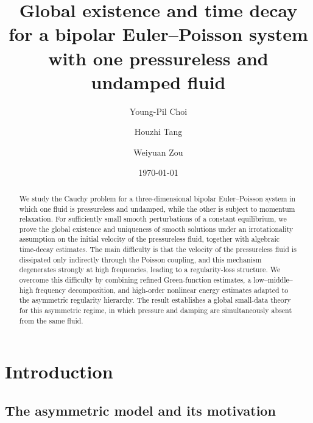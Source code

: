 \documentclass[10pt,reqno]{amsart}
\title[Global existence for an asymmetric bipolar Euler--Poisson system]
{Global existence and time decay for a bipolar Euler--Poisson system
with one pressureless and undamped fluid}
\author[Choi]{Young-Pil Choi}
\author[Tang]{Houzhi Tang}
\author[Zou]{Weiyuan Zou}
\numberwithin{equation}{section}
\begin{document}
\allowdisplaybreaks

\date{\today}




\begin{abstract}
We study the Cauchy problem for a three-dimensional bipolar Euler--Poisson system in which one fluid is pressureless and undamped, while the other is subject to momentum relaxation. For sufficiently small smooth perturbations of a constant equilibrium, we prove the global existence and uniqueness of smooth solutions under an irrotationality assumption on the initial velocity of the pressureless fluid, together with algebraic time-decay estimates. The main difficulty is that the velocity of the pressureless fluid is dissipated only indirectly through the Poisson coupling, and this mechanism degenerates strongly at high frequencies, leading to a regularity-loss structure. We overcome this difficulty by combining refined Green-function estimates, a low--middle--high frequency decomposition, and high-order nonlinear energy estimates adapted to the asymmetric regularity hierarchy. The result establishes a global small-data theory for this asymmetric regime, in which pressure and damping are simultaneously absent from the same fluid.
\end{abstract}

\maketitle  

\tableofcontents




%
%
%
%


\section{Introduction}

%
%
%
%
%
%

\subsection{The asymmetric model and its motivation}
\end{document}
